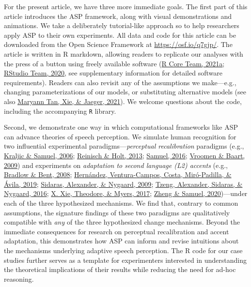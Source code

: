 \documentclass[
  11pt,
  english,
  man,floatsintext]{apa6}
\begin{document}
For the present article, we have three more immediate goals. The first part of this article introduces the ASP framework, along with visual demonstrations and animations. We take a deliberately tutorial-like approach so to help researchers apply ASP to their own experiments. All data and code for this article can be downloaded from the Open Science Framework at \url{https://osf.io/q7gjp/}. The article is written in R markdown, allowing readers to replicate our analyses with the press of a button using freely available software (\protect\hyperlink{ref-R}{R Core Team, 2021a}; \protect\hyperlink{ref-RStudio}{RStudio Team, 2020}, see supplementary information for detailed software requirements). Readers can also revisit any of the assumptions we make---e.g., changing parameterizations of our models, or substituting alternative models (see also \protect\hyperlink{ref-tan2021}{Maryann Tan, Xie, \& Jaeger, 2021}). We welcome questions about the code, including the accompanying \texttt{R} library.

Second, we demonstrate one way in which computational frameworks like ASP can advance theories of speech perception. We simulate human recognition for two influential experimental paradigms---\emph{perceptual recalibration} paradigms (e.g., \protect\hyperlink{ref-kraljic-samuel2006}{Kraljic \& Samuel, 2006}; \protect\hyperlink{ref-reinisch-holt2013}{Reinisch \& Holt, 2013}; \protect\hyperlink{ref-samuel2016}{Samuel, 2016}; \protect\hyperlink{ref-vroomen-baart2009}{Vroomen \& Baart, 2009}) and experiments on \emph{adaptation to second language (L2) accents} (e.g., \protect\hyperlink{ref-bradlow-bent2008}{Bradlow \& Bent, 2008}; \protect\hyperlink{ref-hernandez2019}{Hernández, Ventura-Campos, Costa, Miró-Padilla, \& Ávila, 2019}; \protect\hyperlink{ref-sidaras2009}{Sidaras, Alexander, \& Nygaard, 2009}; \protect\hyperlink{ref-tzeng2016}{Tzeng, Alexander, Sidaras, \& Nygaard, 2016}; \protect\hyperlink{ref-xie2016jep}{X. Xie, Theodore, \& Myers, 2017}; \protect\hyperlink{ref-zheng-samuel2020}{Zheng \& Samuel, 2020})---under each of the three hypothesized mechanisms. We find that, contrary to common assumptions, the signature findings of these two paradigms are qualitatively compatible with \emph{any} of the three hypothesized change mechanisms. Beyond the immediate consequences for research on perceptual recalibration and accent adaptation, this demonstrates how ASP can inform and revise intuitions about the mechanisms underlying adaptive speech perception. The R code for our case studies further serves as a template for experimenters interested in understanding the theoretical implications of their results while reducing the need for ad-hoc reasoning.
\end{document}
